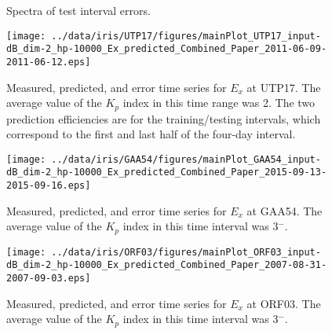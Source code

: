 \documentclass[12pt]{article}
\begin{document}
\clearpage

\begin{figure}[htb]
\centering
  \hfill%
\vspace{1em}
  \hfill%
\vspace{1em}
  \caption{Spectra of test interval errors.}
\label{figure:EySpectra}
\end{figure}

\clearpage
\begin{figure}[h]
\centering
\texttt{[image: ../data/iris/UTP17/figures/mainPlot\_UTP17\_input-dB\_dim-2\_hp-10000\_Ex\_predicted\_Combined\_Paper\_2011-06-09-2011-06-12.eps]}
\caption{Measured, predicted, and error time series for $E_x$ at UTP17. The average value of the $K_p$ index in this time range was 2.  The two prediction efficiencies are for the training/testing intervals, which correspond to the first and last half of the four-day interval.}
\label{figure:UTP17}
\end{figure}

\clearpage
\begin{figure}[h]
\centering
\texttt{[image: ../data/iris/GAA54/figures/mainPlot\_GAA54\_input-dB\_dim-2\_hp-10000\_Ex\_predicted\_Combined\_Paper\_2015-09-13-2015-09-16.eps]}
\caption{Measured, predicted, and error time series for $E_x$ at GAA54.  The average value of the $K_p$ index in this time interval was 3$^-$.}
\label{figure:GAA54}
\end{figure}

\clearpage
\begin{figure}[h]
\centering
\texttt{[image: ../data/iris/ORF03/figures/mainPlot\_ORF03\_input-dB\_dim-2\_hp-10000\_Ex\_predicted\_Combined\_Paper\_2007-08-31-2007-09-03.eps]}
\caption{Measured, predicted, and error time series for $E_x$ at ORF03. The average value of the $K_p$ index in this time interval was 3$^-$.}
\label{figure:ORF03}
\end{figure}
\end{document}
